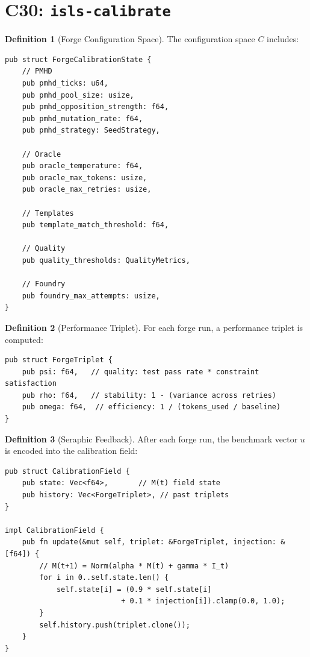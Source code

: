 \documentclass[11pt,a4paper,twoside]{article}
\theoremstyle{definition}
\newtheorem{definition}{Definition}[section]
\theoremstyle{plain}
\theoremstyle{remark}
\begin{document}
\section{C30: \texttt{isls-calibrate}}\label{sec:se:crate}

\begin{definition}[Forge Configuration Space]\label{def:configspace}
The configuration space $C$ includes:
\begin{lstlisting}
pub struct ForgeCalibrationState {
    // PMHD
    pub pmhd_ticks: u64,
    pub pmhd_pool_size: usize,
    pub pmhd_opposition_strength: f64,
    pub pmhd_mutation_rate: f64,
    pub pmhd_strategy: SeedStrategy,

    // Oracle
    pub oracle_temperature: f64,
    pub oracle_max_tokens: usize,
    pub oracle_max_retries: usize,

    // Templates
    pub template_match_threshold: f64,

    // Quality
    pub quality_thresholds: QualityMetrics,

    // Foundry
    pub foundry_max_attempts: usize,
}
\end{lstlisting}
\end{definition}

\begin{definition}[Performance Triplet]\label{def:perftriplet}
For each forge run, a performance triplet is computed:
\begin{lstlisting}
pub struct ForgeTriplet {
    pub psi: f64,   // quality: test pass rate * constraint satisfaction
    pub rho: f64,   // stability: 1 - (variance across retries)
    pub omega: f64,  // efficiency: 1 / (tokens_used / baseline)
}
\end{lstlisting}
\end{definition}

\begin{definition}[Seraphic Feedback]\label{def:feedback}
After each forge run, the benchmark vector $u$ is encoded into the
calibration field:
\begin{lstlisting}
pub struct CalibrationField {
    pub state: Vec<f64>,       // M(t) field state
    pub history: Vec<ForgeTriplet>, // past triplets
}

impl CalibrationField {
    pub fn update(&mut self, triplet: &ForgeTriplet, injection: &[f64]) {
        // M(t+1) = Norm(alpha * M(t) + gamma * I_t)
        for i in 0..self.state.len() {
            self.state[i] = (0.9 * self.state[i]
                           + 0.1 * injection[i]).clamp(0.0, 1.0);
        }
        self.history.push(triplet.clone());
    }
}
\end{lstlisting}
\end{definition}
\end{document}
